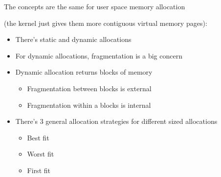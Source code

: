   \begin{slide}


    The concepts are the same for user space memory allocation

    (the kernel just gives them more contiguous virtual memory pages):

    \begin{itemize}
      \item There's static and dynamic allocations
      \item For dynamic allocations, fragmentation is a big concern
      \item Dynamic allocation returns blocks of memory
        \begin{itemize}
          \item Fragmentation between blocks is external
          \item Fragmentation within a blocks is internal
        \end{itemize}
      \item There's 3 general allocation strategies for different sized
            allocations
        \begin{itemize}
          \item Best fit
          \item Worst fit
          \item First fit
        \end{itemize}
    \end{itemize}

  \end{slide}


